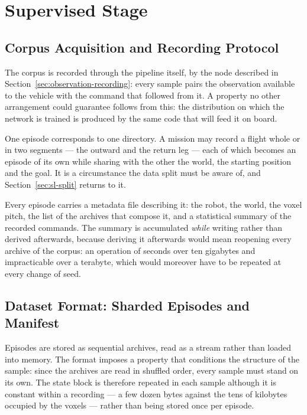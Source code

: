 \section{Supervised Stage}
\label{sec:training-supervised}

\subsection{Corpus Acquisition and Recording Protocol}
\label{sec:sl-corpus}

The corpus is recorded through the pipeline itself, by the node described in
Section~\ref{sec:observation-recording}: every sample pairs the observation
available to the vehicle with the command that followed from it. A property no
other arrangement could guarantee follows from this: the distribution on which
the network is trained is produced by the same code that will feed it on board.

One episode corresponds to one directory. A mission may record a flight whole or
in two segments --- the outward and the return leg --- each of which becomes an
episode of its own while sharing with the other the world, the starting position
and the goal. It is a circumstance the data split must be aware of, and
Section~\ref{sec:sl-split} returns to it.

Every episode carries a metadata file describing it: the robot, the world, the
voxel pitch, the list of the archives that compose it, and a statistical summary
of the recorded commands. The summary is accumulated \emph{while} writing rather
than derived afterwards, because deriving it afterwards would mean reopening
every archive of the corpus: an operation of seconds over ten gigabytes and
impracticable over a terabyte, which would moreover have to be repeated at every
change of seed.

\subsection{Dataset Format: Sharded Episodes and Manifest}
\label{sec:sl-dataset}

Episodes are stored as sequential archives, read as a stream rather than loaded
into memory. The format imposes a property that conditions the structure of the
sample: since the archives are read in shuffled order, every sample must stand
on its own. The state block is therefore repeated in each sample although it is
constant within a recording --- a few dozen bytes against the tens of kilobytes
occupied by the voxels --- rather than being stored once per episode.

